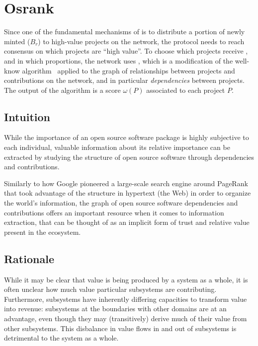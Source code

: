 \section{Osrank}
\label{s:osrank}

\def\Graph{\mathsf{Graph}}
\def\proj{\mathsf{project}}
\def\contributor{\mathsf{account}}
\def\dep{\mathsf{depend}}
\def\own{\mathsf{maintain}}
\def\coown{\mathsf{maintain}^\circ}
\def\contrib{\mathsf{contrib}}
\def\cocontrib{\mathsf{contrib}^\circ}

Since one of the fundamental mechanisms of \oscoin{} is to distribute a portion
of newly minted \oscoin{} ($B_r$) to high-value projects on the network, the protocol
needs to reach consensus on which projects are ``high value''. To choose which
projects receive \oscoin{}, and in which proportions, the network uses
\osrank{}, which is a modification of the well-know \pagerank{}
algorithm~\cite{pagerank} applied to the graph of relationships between
projects and contributions on the network, and in particular
\emph{dependencies} between projects. The output of the algorithm is a score
$\omega(P)$ associated to each project $P$.

\subsection{Intuition}

While the importance of an open source software package is highly subjective to
each individual, valuable information about its relative importance can be
extracted by studying the structure of open source software through
dependencies and contributions.

Similarly to how Google pioneered a large-scale search engine around PageRank
that took advantage of the structure in hypertext (the Web) in order
to organize the world’s information, the graph of open source software
dependencies and contributions offers an important resource when it comes to information
extraction, that can be thought of as an implicit form of trust
and relative value present in the ecosystem.

\subsection{Rationale}

While it may be clear that value is being produced by a system as a whole, it is
often unclear how much value particular subsystems are
contributing. Furthermore, subsystems have inherently differing capacities to
transform value into revenue: subsystems at the boundaries with other domains
are at an advantage, even though they may (transitively) derive much of their
value from other subsystems. This disbalance in value flows in and out of
subsystems is detrimental to the system as a whole.

